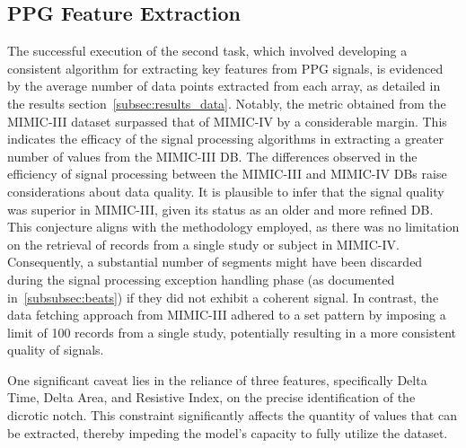 \vspace{-0.5cm}
\subsection{PPG Feature Extraction}
\label{subsec:ppg-feature-extraction}

The successful execution of the second task, which involved developing a consistent algorithm for extracting key features from PPG signals,
is evidenced by the average number of data points extracted from each array, as detailed in the results section~\ref{subsec:results_data}.
Notably, the metric obtained from the MIMIC-III dataset surpassed that of MIMIC-IV by a considerable margin.
This indicates the efficacy of the signal processing algorithms in extracting a greater number of values from the MIMIC-III DB.
The differences observed in the efficiency of signal processing between the MIMIC-III and MIMIC-IV DBs raise considerations about data quality.
It is plausible to infer that the signal quality was superior in MIMIC-III, given its status as an older and more refined DB\@.
This conjecture aligns with the methodology employed, as there was no limitation on the retrieval of records from a single study or subject in MIMIC-IV\@.
Consequently, a substantial number of segments might have been discarded during the signal processing exception handling phase (as documented in~\ref{subsubsec:beats}) if they did not exhibit a coherent signal.
In contrast, the data fetching approach from MIMIC-III adhered to a set pattern by imposing a limit of 100 records from a single study, potentially resulting in a more consistent quality of signals.

One significant caveat lies in the reliance of three features, specifically Delta Time, Delta Area, and Resistive Index, on the precise identification of the dicrotic notch.
This constraint significantly affects the quantity of values that can be extracted, thereby impeding the model's capacity to fully utilize the dataset.

